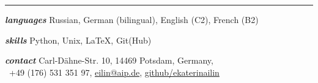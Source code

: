 \documentclass[9.5pt]{k-cv} %
\begin{document}
\textcolor{red}{ \rule{19cm}{1pt} }
 
\begin{entrylist}

\entry
{\Large{\textit{\textbf{languages}}}}
{Russian, German (bilingual), English (C2), French (B2)}
{}{}

\entry
{\Large{\textit{\textbf{skills}}}}
{Python, Unix, LaTeX, Git(Hub)}
{}{}

\entry
{\Large{\textit{\textbf{contact}}}}
{Carl-D\"ahne-Str. 10, 14469 Potsdam, Germany,\\~+49 (176) 531 351 97, \href{mailto:eilin@aip.de}{eilin@aip.de}, \href{https://github.com/ekaterinailin}{github/ekaterinailin}}
{}{}
\end{entrylist}
\end{document}
